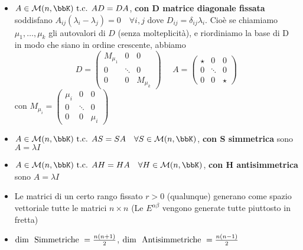 \documentclass[a4paper,NoNotes,GeneralMath]{stdmdoc}
\begin{document}
\begin{itemize}
		\item $A \in \mathcal{M}(n, \bbK) \tc AD = DA$, {\bf con $\bm D$ matrice diagonale fissata} soddisfano $A_{ij}(\lambda_i - \lambda_j) = 0 \quad \forall i,j$ dove $D_{ij} = \delta_{ij}\lambda_i$. Cioè se chiamiamo $\mu_1, \ldots, \mu_k$ gli autovalori di $D$ (senza molteplicità), e riordiniamo la base di D in modo che siano in ordine crescente, abbiamo $$D = \left(\begin{array}{c|c|c} M_{\mu_1} & 0 & 0 \\ \hline 0 & \ddots & 0 \\ \hline 0 & 0 & M_{\mu_k} \end{array}\right) \ \ \ \ \ \ A = \left(\begin{array}{c|c|c} \star & 0 & 0 \\ \hline 0 & \ddots & 0 \\ \hline 0 & 0 & \star \end{array}\right) $$ con $M_{\mu_i} = \left(\begin{array}{ccc} \mu_i & 0 & 0 \\ 0 & \ddots & 0 \\ 0 & 0 & \mu_i \end{array}\right)$
		\item $A \in \mathcal{M}(n, \bbK) \tc AS = SA \quad \forall S \in \mathcal{M}(n, \bbK)$, {\bf con $\bm S$ simmetrica} sono $A = \lambda I$
		\item $A \in \mathcal{M}(n, \bbK) \tc AH = HA \quad \forall H \in \mathcal{M}(n, \bbK)$, {\bf con $\bm H$ antisimmetrica} sono $A = \lambda I$
		\item Le matrici di un certo rango fissato $r > 0$ (qualunque) generano come spazio vettoriale tutte le matrici $n\times n$ (Le $E^{\alpha\beta}$ vengono generate tutte piuttosto in fretta)
		\item $\mbox{dim } \mbox{ Simmetriche } = \frac{n(n+1)}{2}$, $\mbox{dim } \mbox{ Antisimmetriche } = \frac{n(n-1)}{2}$
	\end{itemize}
	
\end{document}
